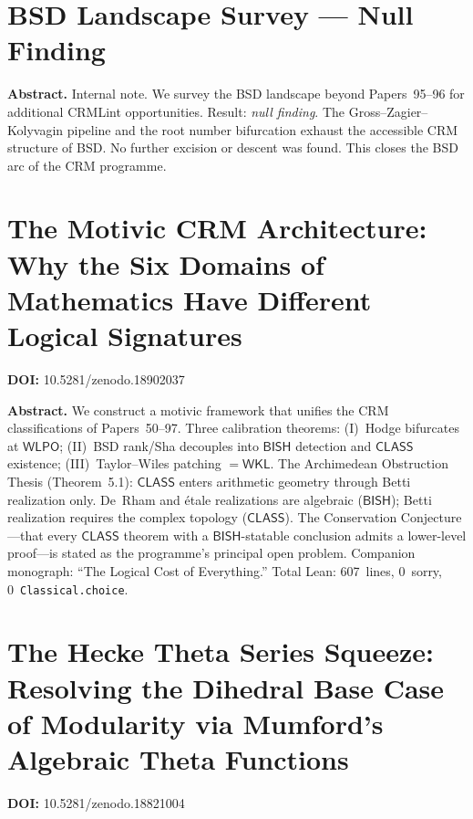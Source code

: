 \documentclass[11pt,a4paper]{article}
\begin{document}
\section{BSD Landscape Survey --- Null Finding}
\label{sec:p97}

\bigskip
\noindent\textbf{Abstract.}
Internal note. We survey the BSD landscape beyond Papers~95--96 for additional CRMLint opportunities. Result: \emph{null finding}. The Gross--Zagier--Kolyvagin pipeline and the root number bifurcation exhaust the accessible CRM structure of BSD. No further excision or descent was found. This closes the BSD arc of the CRM programme.

\section{The Motivic CRM Architecture: Why the Six Domains of Mathematics Have Different Logical Signatures}
\label{sec:p98}
\textbf{DOI:} 10.5281/zenodo.18902037

\bigskip
\noindent\textbf{Abstract.}
We construct a motivic framework that unifies the CRM classifications of Papers~50--97. Three calibration theorems: (I)~Hodge bifurcates at $\mathsf{WLPO}$; (II)~BSD rank/Sha decouples into $\mathsf{BISH}$ detection and $\mathsf{CLASS}$ existence; (III)~Taylor--Wiles patching $= \mathsf{WKL}$. The Archimedean Obstruction Thesis (Theorem~5.1): $\mathsf{CLASS}$ enters arithmetic geometry through Betti realization only. De~Rham and \'etale realizations are algebraic ($\mathsf{BISH}$); Betti realization requires the complex topology ($\mathsf{CLASS}$). The Conservation Conjecture---that every $\mathsf{CLASS}$ theorem with a $\mathsf{BISH}$-statable conclusion admits a lower-level proof---is stated as the programme's principal open problem. Companion monograph: ``The Logical Cost of Everything.'' Total Lean: 607~lines, 0~sorry, 0~\texttt{Classical.choice}.

\section{The Hecke Theta Series Squeeze: Resolving the Dihedral Base Case of Modularity via Mumford's Algebraic Theta Functions}
\label{sec:p99}
\textbf{DOI:} 10.5281/zenodo.18821004
\end{document}
